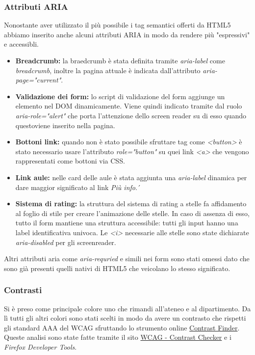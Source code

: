 \subsubsection{Attributi ARIA}
Nonostante aver utilizzato il più possibile i tag semantici offerti da HTML5 abbiamo inserito anche alcuni attributi ARIA in modo da rendere più "espressivi" e accessibli.
\begin{itemize}
    \item \textbf{Breadcrumb:} la braedcrumb è stata definita tramite \textit{aria-label} come \textit{breadcrumb}, inoltre la pagina attuale è indicata dall'attributo \textit{aria-page="current"}.
    \item \textbf{Validazione dei form:} lo script di validazione del form aggiunge un elemento nel DOM dinamicamente. Viene quindi indicato tramite dal ruolo \textit{aria-role="alert"} che porta l'attenzione dello screen reader su di esso quando questoviene inserito nella pagina.
    \item \textbf{Bottoni link:} quando non è stato possibile sfruttare tag come \textit{<button>} è stato necessario usare l'attributo \textit{role="button"} su quei link \textit{<a>} che vengono rappresentati come bottoni via CSS.
    \item \textbf{Link aule:} nelle card delle aule è stata aggiunta una \textit{aria-label} dinamica per dare maggior significato al link \textit{Più info}.´
    \item \textbf{Sistema di rating:} la struttura del sistema di rating a stelle fa affidamento al foglio di stile per creare l'animazione delle stelle. In caso di assenza di esso, tutto il form mantiene una struttura accessibile: tutti gli input hanno una label identificativa univoca. Le \textit{<i>} necessarie alle stelle sono state dichiarate \textit{aria-disabled} per gli screenreader. 
\end{itemize}
Altri attributi aria come \textit{aria-requried} e simili nei form sono stati omessi dato che sono già presenti quelli nativi di HTML5 che veicolano lo stesso significato.

\subsubsection{Contrasti}
Si è preso come principale colore uno che rimandi all'ateneo e al dipartimento. Da lì tutti gli altri colori sono stati scelti in modo da avere un contrasto che rispetti gli standard AAA del WCAG sfruttando lo strumento online \href{https://app.contrast-finder.org/}{Contrast Finder}. Queste analisi sono state fatte tramite il sito \href{https://contrastchecker.com/}{WCAG - Contrast Checker} e i \textit{Firefox Developer Tools}.

